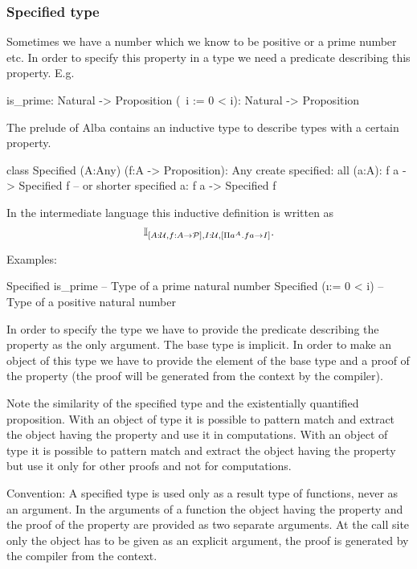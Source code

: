\subsubsection{Specified type}


Sometimes we have a number which we know to be positive or a prime number
etc. In order to specify this property in a type we need a predicate
describing this property. E.g.

\begin{alba}
  is_prime:       Natural -> Proposition
  (\ i := 0 < i): Natural -> Proposition
\end{alba}

The prelude of Alba contains an inductive type to describe types with a
certain property.

\begin{alba}
  class
    Specified (A:Any) (f:A -> Proposition): Any
  create
    specified: all (a:A): f a -> Specified f
    -- or shorter
    specified a: f a -> Specified f
\end{alba}

In the intermediate language this inductive definition is written as
$$
\mathbb{I}_{[A:{\cal{U}}, f:A \to {\cal{P}}], I:{\cal{U}}, [\Pi a^A . f a \to I]}.
$$

\noindent Examples:
\begin{alba}
  Specified is_prime       -- Type of a prime natural number
  Specified (\i := 0 < i)  -- Type of a positive natural number
\end{alba}

In order to specify the type we have to provide the predicate describing the
property as the only argument. The base type is implicit. In order to make an
object of this type we have to provide the element of the base type and a
proof of the property (the proof will be generated from the context by the
compiler).

Note the similarity of the specified type and the existentially quantified
proposition. With an object of type  it is possible
to pattern match and extract the object having the property and use it in
computations. With an object of type  it is possible to
pattern match and extract the object having the property but use it only for
other proofs and not for computations.

Convention: A specified type is used only as a result type of functions, never
as an argument. In the arguments of a function the object having the property
and the proof of the property are provided as two separate arguments. At the
call site only the object has to be given as an explicit argument, the proof
is generated by the compiler from the context.

